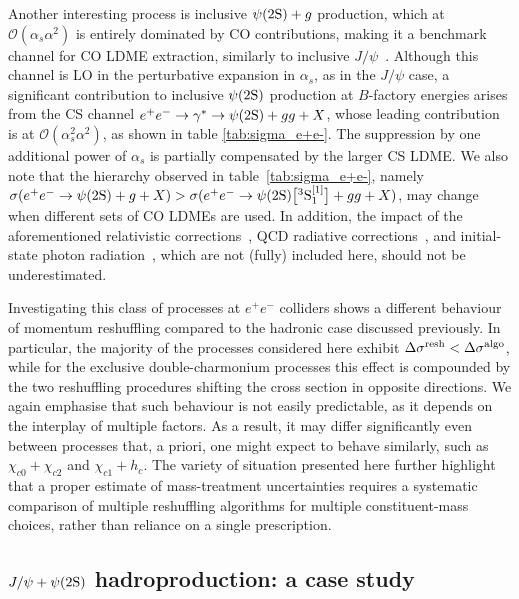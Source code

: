 Another interesting process is inclusive $\psi(2\mathrm{S}) + g$ production, which at $\mathcal{O}(\alpha_s\alpha^2)$ is entirely dominated by CO contributions, making it a benchmark channel for CO LDME extraction, similarly to inclusive $J/\psi$~\cite{Braaten:1995ez,Zhang:2009ym}. 
Although this channel is LO in the perturbative expansion in $\alpha_s$, as in the $J/\psi$ case, a significant contribution to inclusive $\psi(2\mathrm{S})$ production at $B$-factory energies arises from the CS channel $e^+e^-\to\gamma^*\to \psi(2\mathrm{S})+gg+X$, whose leading contribution is at $\mathcal{O}(\alpha_s^2\alpha^2)$, as shown in table \ref{tab:sigma_e+e-}. The suppression by one additional power of $\alpha_s$ is partially compensated by the larger CS LDME.  
We also note that the hierarchy observed in table~\ref{tab:sigma_e+e-}, namely $\sigma(e^+e^-\to \psi(2\mathrm{S})+g+X) > \sigma(e^+e^-\to \psi(2\mathrm{S})\big[{}^3\mathrm{S}_1^{[1]}\big]+gg+X)$, may change when different sets of CO LDMEs are used. In addition, the impact of the aforementioned relativistic corrections~\cite{He:2009uf,Jia:2009np,Li:2026zsu,Jiang:2026ieb}, QCD radiative corrections~\cite{Zhang:2009ym,Ma:2008gq,Gong:2009kp}, and initial-state photon radiation~\cite{Shao:2014rwa,Gong:2019rpd}, which are not (fully) included here, should not be underestimated.

Investigating this class of processes at $e^+ e^-$ colliders shows a different behaviour of momentum reshuffling compared to the hadronic case discussed previously. In particular, the majority of the processes considered here exhibit $\Delta \sigma^{\rm resh} < \Delta \sigma^{\rm algo}$, while for the exclusive double-charmonium processes this effect is compounded by the two reshuffling procedures shifting the cross section in opposite directions. We again emphasise that such behaviour is not easily predictable, as it depends on the interplay of multiple factors. As a result, it may differ significantly even between processes that, a priori, one might expect to behave similarly, such as $\chi_{c0} + \chi_{c2}$ and $\chi_{c1} + h_c$.
The variety of situation presented here further highlight that a proper estimate of mass-treatment uncertainties requires a systematic comparison of multiple reshuffling algorithms for multiple constituent-mass choices, rather than reliance on a single prescription.



\subsection[\texorpdfstring{$J/\psi + \psi(2\swave)$}{J/psi + psi(2S)} hadroproduction: a case study]{\boldmath $J/\psi + \psi(2\swave)$ hadroproduction: a case study}\label{sec:jpsipsi2sresult}

